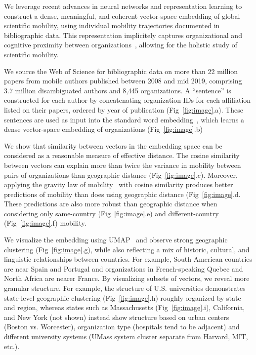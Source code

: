 \documentclass[a4paper,12pt]{article}
\begin{document}
We leverage recent advances in neural networks and representation learning to construct a dense, meaningful, and coherent vector-space embedding of global scientific mobility, using individual mobility trajectories documented in bibliographic data. 
This representation implicitely captures organizational and cognitive proximity between organizations~\autocite{boschma_proximity_2005}, allowing for the holistic study of scientific mobility. 

We source the Web of Science for bibliographic data on more than 22 million papers from mobile authors published between 2008 and mid 2019, comprising 3.7 million disambiguated authors and 8,445 organizations. 
A ``sentence'' is constructed for each author by concatenating organization IDs for each affiliation listed on their papers, ordered by year of publication (Fig~\ref{fig:image}.a).
These sentences are used as input into the standard word embedding~\autocite{mikolov_distributed_2013}, which learns a dense vector-space embedding of organizations (Fig~\ref{fig:image}.b) 

We show that similarity between vectors in the embedding space can be considered as a reasonable measure of effective distance. 
The cosine similarity between vectors can explain more than twice the variance in mobility between pairs of organizations than geographic distance (Fig~\ref{fig:image}.c). 
Moreover, applying the gravity law of mobility~\autocite{simini_universal_2012} with cosine similarity produces better predictions of mobility than does using geographic distance (Fig~\ref{fig:image}.d.
These predictions are also more robust than geographic distance when considering only same-country (Fig~\ref{fig:image}.e) and different-country (Fig~\ref{fig:image}.f) mobility. 

We visualize the embedding using UMAP~\autocite{mcinnes_umap_2018} and observe strong geographic clustering (Fig~\ref{fig:image}.g), while also reflecting a mix of historic, cultural, and linguistic relationships between countries. 
For example, South American countries are near Spain and Portugal and organizations in French-speaking Quebec and North Africa are nearer France. 
By visualizing subsets of vectors, we reveal more granular structure.
For example, the structure of U.S. universities demonstrates state-level geographic clustering (Fig~\ref{fig:image}.h) roughly organized by state and region, whereas states such as Massachusetts (Fig~\ref{fig:image}.i), California, and New York (not shown) instead show structure based on urban centers (Boston vs. Worcester), organization type (hospitals tend to be adjacent) and different university systems (UMass system cluster separate from Harvard, MIT, etc.).
\end{document}
